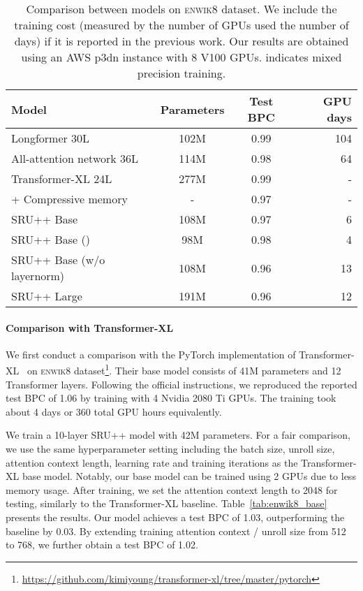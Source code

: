 \documentclass[11pt,a4paper]{article}
\begin{document}
\begin{table*}[!t]
    \centering
    \begin{tabular}{lccr}
    \toprule
    \bf Model & \bf Parameters  & \bf Test BPC  & \bf GPU days \\
    \hline
    Longformer 30L~\cite{Beltagy2020Longformer} & 102M & 0.99 & 104\\
    All-attention network 36L~\cite{sukhbaatar2019augmenting} & 114M & 0.98 & 64\\
    Transformer-XL 24L~\cite{dai-etal-2019-transformer}& 277M & 0.99 & - \\
      + Compressive memory~\cite{Rae2020Compressive} & - & 0.97 & -\\
    \hline
    SRU++ Base & 108M & 0.97 & 6 \\
    SRU++ Base () & 98M & 0.98 & 4 \\
    SRU++ Base (w/o layernorm) & 108M & 0.96 & 13 \\
    \hdashline
    SRU++ Large & 191M & 0.96 & 12 \\
\bottomrule
    \end{tabular}
    \caption{Comparison between models on \textsc{enwik8} dataset. We include the training cost (measured by the number of GPUs used  the number of days) if it is reported in the previous work. Our results are obtained using an AWS p3dn instance with 8 V100 GPUs.  indicates mixed precision training.}
    \label{tab:enwik8_sota}
\end{table*}

\paragraph{Comparison with Transformer-XL}
We first conduct a comparison with the PyTorch implementation of Transformer-XL~\cite{dai-etal-2019-transformer} on \textsc{enwik8} dataset\footnote{\url{https://github.com/kimiyoung/transformer-xl/tree/master/pytorch}}.
Their base model consists of 41M parameters and 12 Transformer layers.
Following the official instructions, we reproduced the reported test BPC of 1.06 by training with 4 Nvidia 2080 Ti GPUs.
The training took about 4 days or 360 total GPU hours equivalently.

We train a 10-layer SRU++ model with 42M parameters. For a fair comparison, we use the same hyperparameter setting including the batch size, unroll size, attention context length, learning rate and training iterations as the Transformer-XL base model.
Notably, our base model can be trained using 2 GPUs due to less memory usage. 
After training, we set the attention context length to 2048 for testing, similarly to the Transformer-XL baseline.
Table~\ref{tab:enwik8_base} presents the results.
Our model achieves a test BPC of 1.03, outperforming the baseline by 0.03.
By extending training attention context / unroll size from 512 to 768, we further obtain a test BPC of 1.02.
\end{document}
